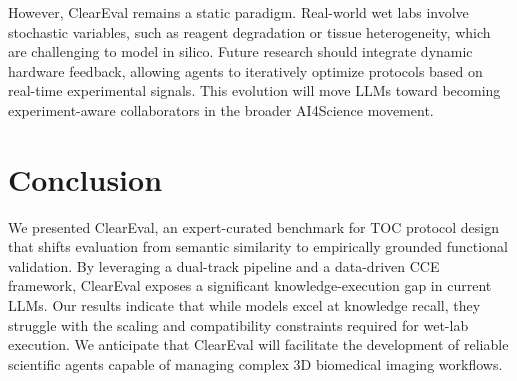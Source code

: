 \documentclass[runningheads]{llncs}
\begin{document}
However, ClearEval remains a static paradigm. Real-world wet labs involve stochastic variables, such as reagent degradation or tissue heterogeneity, which are challenging to model in silico. Future research should integrate dynamic hardware feedback, allowing agents to iteratively optimize protocols based on real-time experimental signals. This evolution will move LLMs toward becoming experiment-aware collaborators in the broader AI4Science movement.

\section{Conclusion}
We presented ClearEval, an expert-curated benchmark for TOC protocol design that shifts evaluation from semantic similarity to empirically grounded functional validation. By leveraging a dual-track pipeline and a data-driven CCE framework, ClearEval exposes a significant knowledge-execution gap in current LLMs. Our results indicate that while models excel at knowledge recall, they struggle with the scaling and compatibility constraints required for wet-lab execution. We anticipate that ClearEval will facilitate the development of reliable scientific agents capable of managing complex 3D biomedical imaging workflows.



\end{document}
